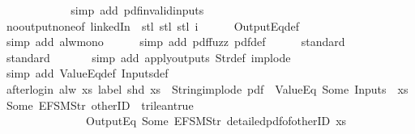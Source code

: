 \begin{isabellebody}
\ \ \ \ \ \isamarkupfalse%
\isanewline
\ \ \ \ \ \isamarkupfalse%
\ {\isacharparenleft}simp\ add{\isacharcolon}\ pdf{\isacharunderscore}{}{\isacharunderscore}invalid{\isacharunderscore}inputs{\isacharparenright}\isanewline
\ \ \ \ \isamarkupfalse%
\ no{\isacharunderscore}output{\isacharunderscore}none{\isacharbrackleft}of\ linkedIn\ {\isachardoublequoteopen}{\isacharless}{\isachargreater}{\isachardoublequoteclose}\ {\isachardoublequoteopen}stl\ {\isacharparenleft}stl\ {\isacharparenleft}stl\ i{\isacharparenright}{\isacharparenright}{\isachardoublequoteclose}{\isacharbrackright}\isanewline
\ \ \ \ \isamarkupfalse%
\ OutputEq{\isacharunderscore}def\isanewline
\ \ \ \ \ \isamarkupfalse%
\ {\isacharparenleft}simp\ add{\isacharcolon}\ alw{\isacharunderscore}mono{\isacharparenright}\isanewline
\ \ \ \ \isamarkupfalse%
\ {\isacharparenleft}simp\ add{\isacharcolon}\ pdf{\isacharunderscore}fuzz\ pdf{}{\isacharunderscore}def{\isacharparenright}\isanewline
\ \ \ \ \isamarkupfalse%
\ standard\isanewline
\ \ \ \ \ \isamarkupfalse%
\ standard\isanewline
\ \ \ \ \ \isamarkupfalse%
\ {\isacharparenleft}simp\ add{\isacharcolon}\ apply{\isacharunderscore}outputs\ Str{\isacharunderscore}def\ implode{\isacharparenright}\isanewline
\ \ \ \ \ \isamarkupfalse%
\ {\isacharparenleft}simp\ add{\isacharcolon}\ ValueEq{\isacharunderscore}def\ Inputs{\isacharunderscore}def{\isacharparenright}\isanewline
\ \ \ \ \isamarkupfalse%
%
\endisatagproof
{\isafoldproof}%
%
\isadelimproof
\isanewline
%
\endisadelimproof
\isanewline
{}\isamarkupfalse%
\ after{\isacharunderscore}login{\isacharcolon}\ {\isachardoublequoteopen}alw\ {\isacharparenleft}{\isasymlambda}xs{\isachardot}\ label\ {\isacharparenleft}shd\ xs{\isacharparenright}\ {\isacharequal}\ String{\isachardot}implode\ {\isacharprime}{\isacharprime}pdf{\isacharprime}{\isacharprime}\ {\isasymand}\ ValueEq\ {\isacharparenleft}Some\ {\isacharparenleft}Inputs\ {}\ xs{\isacharparenright}{\isacharparenright}\ {\isacharparenleft}Some\ {\isacharparenleft}EFSM{\isachardot}Str\ {\isacharprime}{\isacharprime}otherID{\isacharprime}{\isacharprime}{\isacharparenright}{\isacharparenright}\ {\isacharequal}\ trilean{\isachardot}true\ {\isasymlongrightarrow}\isanewline
\ \ \ \ \ \ \ \ \ \ \ \ \ \ {\isasymnot}\ OutputEq\ {\isacharbrackleft}Some\ {\isacharparenleft}EFSM{\isachardot}Str\ {\isacharprime}{\isacharprime}detailed{\isacharunderscore}pdf{\isacharunderscore}of{\isacharunderscore}otherID{\isacharprime}{\isacharprime}{\isacharparenright}{\isacharbrackright}\ xs{\isacharparenright}\isanewline

\end{isabellebody}

